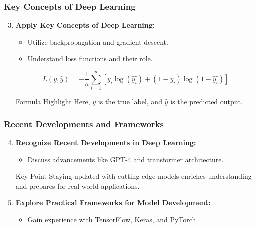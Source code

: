 \documentclass[aspectratio=169]{beamer}
\begin{document}
\begin{frame}[fragile]
    \frametitle{Key Concepts of Deep Learning}
    \begin{enumerate}
        \setcounter{enumi}{2}
        \item \textbf{Apply Key Concepts of Deep Learning:}
        \begin{itemize}
            \item Utilize backpropagation and gradient descent.
            \item Understand loss functions and their role.
        \end{itemize}
        
        \begin{equation}
            L(y, \hat{y}) = -\frac{1}{n} \sum_{i=1}^{n} [y_i \log(\hat{y_i}) + (1-y_i) \log(1-\hat{y_i})]
        \end{equation}
        
        \begin{block}{Formula Highlight}
            Here, \( y \) is the true label, and \( \hat{y} \) is the predicted output.
        \end{block}
    \end{enumerate}
\end{frame}

\begin{frame}
    \frametitle{Recent Developments and Frameworks}
    \begin{enumerate}
        \setcounter{enumi}{3}
        \item \textbf{Recognize Recent Developments in Deep Learning:}
        \begin{itemize}
            \item Discuss advancements like GPT-4 and transformer architecture.
        \end{itemize}

        \begin{block}{Key Point}
            Staying updated with cutting-edge models enriches understanding and prepares for real-world applications.
        \end{block}

        \item \textbf{Explore Practical Frameworks for Model Development:}
        \begin{itemize}
            \item Gain experience with TensorFlow, Keras, and PyTorch.
        \end{itemize}
    \end{enumerate}
\end{frame}
\end{document}
